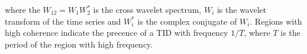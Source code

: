 where the $W_{12}= W_1W^*_2$ is the cross wavelet spectrum, $W_i$ is the wavelet transform of the time series and $W^*_i$ is the complex conjugate of $W_i$. Regions with high coherence indicate the precence of a TID with frequency $1/T$, where $T$ is the period of the region with high frequency.

     
     

